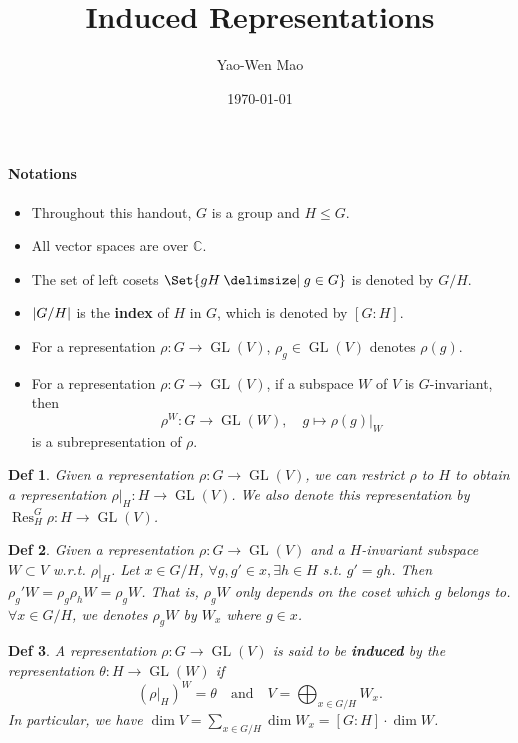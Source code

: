 \documentclass[a4paper]{article}
\title{Induced Representations}
\author{Yao-Wen Mao}
\date{\today}
\DeclarePairedDelimiter{\abs}{\lvert}{\rvert}
\newcommand*{\Cb}{\mathbb{C}}
\DeclareMathOperator{\Res}{Res}
\newcommand*\GL[1]{\operatorname{GL}\mathopen{}\left({#1}\right)\mathclose{}}
\providecommand\given{}
\newcommand*\SetSymbol[1][]{%
  \nonscript\:#1\vert
  \allowbreak
  \nonscript\:
\mathopen{}}
\renewcommand\given{\SetSymbol[\delimsize]}
\renewcommand\given{\SetSymbol[\delimsize]}
\theoremstyle{mystyle}
\newtheorem{definition}{Def}
\begin{document}
\maketitle
\paragraph{Notations} \mbox{}
\begin{itemize}
  \item Throughout this handout, $G$ is a group and $H \le G$.
  \item All vector spaces are over $\Cb$.
  \item The set of left cosets $\Set{ gH \given g \in G }$ is denoted by $G/H$.
  \item $\abs{G/H}$ is the {\bf index} of $H$ in $G$, which is
    denoted by $[G:H]$.
  \item For a representation $\rho: G\to \GL{V}$, $\rho_g \in \GL{V}$ denotes
    $\rho(g)$.
  \item For a representation $\rho: G\to \GL{V}$, if a subspace $W$ of $V$
    is $G$-invariant, then
    \[
      \rho^W: G\to \GL{W}, \quad g \mapsto \rho(g)|_W
    \]
    is a subrepresentation of $\rho$.
\end{itemize}

\begin{definition}
  Given a representation $\rho: G \to \GL{V}$, we can restrict $\rho$ to $H$
  to obtain a representation $\rho|_H: H \to \GL{V}$. We also denote this
  representation by $\Res^G_H \rho : H\to \GL{V}$.
\end{definition}

\begin{definition}
  Given a representation $\rho: G\to \GL{V}$ and a $H$-invariant
  subspace $W \subset V$ w.r.t. $\rho|_H$. Let $x \in G/H$,
  $\forall g, g' \in x, \exists h \in H$ s.t. $g' = gh$. Then
  $\rho_g' W = \rho_g \rho_h W = \rho_g W$. That is, $\rho_g W$ only
  depends on the coset which $g$ belongs to.
  $\forall x \in G/H$, we denotes $\rho_g W$ by $W_x$ where $g \in x$.
\end{definition}

\begin{definition}
  A representation $\rho: G\to \GL{V}$ is said to be {\bf induced} by
  the representation $\theta: H\to \GL{W}$ if
  \[
    (\rho|_H)^W = \theta \quad \text{and} \quad V = \bigoplus_{x\in G/H} W_x.
  \]
  In particular, we have
  $\displaystyle \dim V = \sum_{x\in G/H} \dim W_x = [G:H] \cdot \dim W$.
\end{definition}
\end{document}

